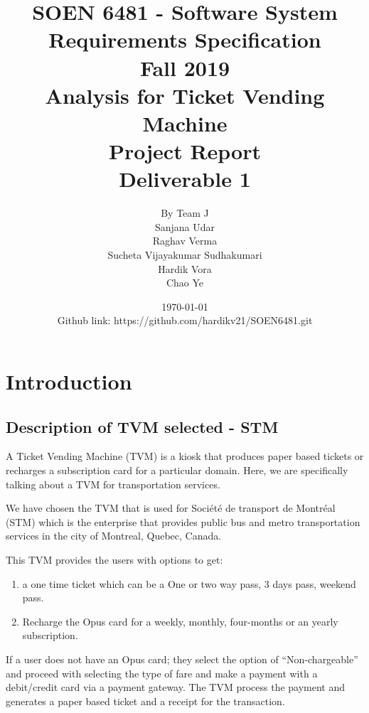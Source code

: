 \documentclass[12pt]{report}
\begin{document}
\title{\textbf{SOEN 6481 - Software System Requirements Specification}\\[1ex]\normalsize{Fall 2019}\\[6ex]\LARGE{\textbf{Analysis for Ticket Vending Machine\\Project Report}}\\[3ex]\LARGE{Deliverable 1}}
\author{By Team J\\Sanjana Udar\\Raghav Verma\\Sucheta Vijayakumar Sudhakumari\\Hardik Vora\\Chao Ye}
\date{\today\\[2ex]Github link: https://github.com/hardikv21/SOEN6481.git}
\maketitle

\tableofcontents
\clearpage

\chapter{Introduction}
\section{Description of TVM selected - STM}
A Ticket Vending Machine (TVM) is a kiosk that produces paper based tickets or recharges a subscription card for a particular domain. Here, we are specifically talking about a TVM for transportation services.

We have chosen the TVM that is used for Société de transport de Montréal (STM) which is the enterprise that provides public bus and metro transportation services in the city of Montreal, Quebec, Canada. 

This TVM provides the users with options to get:
\begin{enumerate}
\item a one time ticket which can be a One or two way pass, 3 days pass, weekend pass.
\item Recharge the Opus card for a weekly, monthly, four-months or an yearly subscription. 
\end{enumerate}

If a user does not have an Opus card; they select the option of “Non-chargeable” and proceed with selecting the type of fare and make a payment with a debit/credit card via a payment gateway. The TVM process the payment and generates a paper based ticket and a receipt for the transaction.
\end{document}
